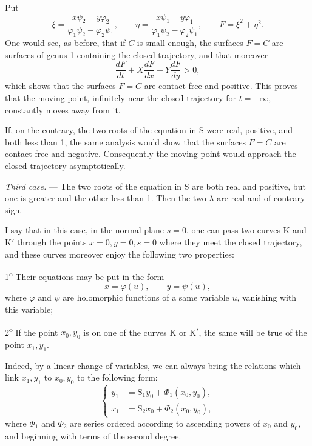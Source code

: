 \documentclass[11pt]{article}
\begin{document}
Put
\[
\xi=\frac{x\psi_2-y\varphi_2}{\varphi_1\psi_2-\varphi_2\psi_1},
\qquad
\eta=\frac{x\psi_1-y\varphi_1}{\varphi_1\psi_2-\varphi_2\psi_1},
\qquad
F=\xi^2+\eta^2.
\]
One would see, as before, that if $C$ is small enough, the surfaces $F=C$ are surfaces of genus 1 containing the closed trajectory, and that moreover
\[
\frac{dF}{dt}+X\frac{dF}{dx}+Y\frac{dF}{dy}>0,
\]
which shows that the surfaces $F=C$ are contact-free and positive. This proves that the moving point, infinitely near the closed trajectory for $t=-\infty$, constantly moves away from it.

If, on the contrary, the two roots of the equation in $\mathrm{S}$ were real, positive, and both less than 1, the same analysis would show that the surfaces $F=C$ are contact-free and negative. Consequently the moving point would approach the closed trajectory asymptotically.

\emph{Third case.} — The two roots of the equation in $\mathrm{S}$ are both real and positive, but one is greater and the other less than 1. Then the two $\lambda$ are real and of contrary sign.

I say that in this case, in the normal plane $s=0$, one can pass two curves K and K$'$ through the points $x=0,y=0,s=0$ where they meet the closed trajectory, and these curves moreover enjoy the following two properties:

1\textsuperscript{o} Their equations may be put in the form
\[
x=\varphi(u),
\qquad
y=\psi(u),
\]
where $\varphi$ and $\psi$ are holomorphic functions of a same variable $u$, vanishing with this variable;

2\textsuperscript{o} If the point $x_0,y_0$ is on one of the curves K or K$'$, the same will be true of the point $x_1,y_1$.

Indeed, by a linear change of variables, we can always bring the relations which link $x_1,y_1$ to $x_0,y_0$ to the following form:
\begin{equation}
\left\{
\begin{aligned}
y_1&=\mathrm{S}_1y_0+\Phi_1(x_0,y_0),\\
x_1&=\mathrm{S}_2x_0+\Phi_2(x_0,y_0),
\end{aligned}
\right.
\tag{3}
\end{equation}
where $\Phi_1$ and $\Phi_2$ are series ordered according to ascending powers of $x_0$ and $y_0$, and beginning with terms of the second degree.
\end{document}
